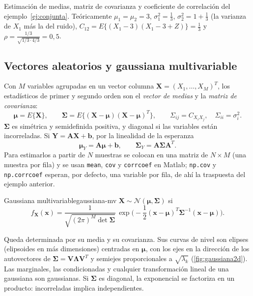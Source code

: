 \documentclass[11pt,a4paper]{scrartcl}
\begin{document}
\begin{encodigo}
  Estimación de medias, matriz de covarianza y coeficiente de correlación del ejemplo~\ref{ej:conjunta}. Teóricamente $\mu_1=\mu_2=3$, $\sigma_1^2=\frac13$, $\sigma_2^2=1+\frac13$ (la varianza de $X_1$ más la del ruido), $C_{12}=E\{(X_1-3)(X_1-3+Z)\}=\frac13$ y $\rho=\frac{1/3}{\sqrt{1/3\cdot4/3}}=0{,}5$.
\end{encodigo}

\subsection{Vectores aleatorios y gaussiana multivariable}

Con $M$ variables agrupadas en un vector columna $\mathbf X=(X_1,\dots,X_M)^T$, los estadísticos de primer y segundo orden son el \emph{vector de medias} y la \emph{matriz de covarianza}:
\[
  \boldsymbol\mu=E\{\mathbf X\},\qquad
  \boldsymbol\Sigma=E\{(\mathbf X-\boldsymbol\mu)(\mathbf X-\boldsymbol\mu)^T\},\qquad\Sigma_{ij}=C_{X_iX_j},\quad\Sigma_{ii}=\sigma_i^2 .
\]
$\boldsymbol\Sigma$ es simétrica y semidefinida positiva, y diagonal si las variables están incorreladas. Si $\mathbf Y=\mathbf A\mathbf X+\mathbf b$, por la linealidad de la esperanza
\[
  \boldsymbol\mu_Y=\mathbf A\boldsymbol\mu+\mathbf b,\qquad\boldsymbol\Sigma_Y=\mathbf A\boldsymbol\Sigma\mathbf A^T .
\]
Para estimarlos a partir de $N$ muestras se colocan en una matriz de $N\times M$ (una muestra por fila) y se usan \texttt{mean}, \texttt{cov} y \texttt{corrcoef} en Matlab; \texttt{np.cov} y \texttt{np.corrcoef} esperan, por defecto, una variable por fila, de ahí la traspuesta del ejemplo anterior.

\begin{definicion}{Gaussiana multivariable}{gaussiana-mv}
  $\mathbf X\sim\mathcal N(\boldsymbol\mu,\boldsymbol\Sigma)$ si
  \[
    f_{\mathbf X}(\mathbf x)=\frac1{\sqrt{(2\pi)^M\det\boldsymbol\Sigma}}\,\exp\!\Big(-\frac12(\mathbf x-\boldsymbol\mu)^T\boldsymbol\Sigma^{-1}(\mathbf x-\boldsymbol\mu)\Big).
  \]
\end{definicion}

Queda determinada por su media y su covarianza. Sus curvas de nivel son elipses (elipsoides en más dimensiones) centradas en $\boldsymbol\mu$, con los ejes en la dirección de los autovectores de $\boldsymbol\Sigma=\mathbf V\boldsymbol\Lambda\mathbf V^T$ y semiejes proporcionales a $\sqrt{\lambda_k}$ (\cref{fig:gaussiana2d}). Las marginales, las condicionadas y cualquier transformación lineal de una gaussiana son gaussianas. Si $\boldsymbol\Sigma$ es diagonal, la exponencial se factoriza en un producto: incorreladas implica independientes.
\end{document}
